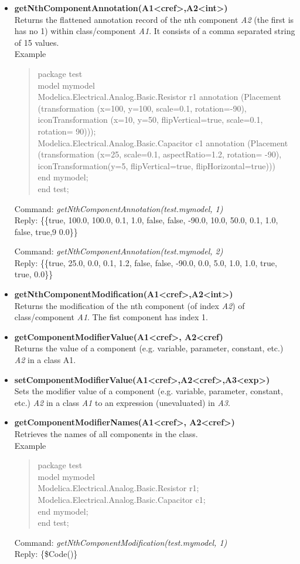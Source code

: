 \documentclass[11pt,a4paper,oneside,english]{book}
\newenvironment{modelicaExamples}{\begin{itemize}}{\end{itemize}}
\newcommand{\api}[2]{\item \textbf{#1} \\ #2}
\newcommand{\tab}{\hspace{2em}}
\newcommand{\command}[1]{Command: \textit{#1}\\}
\newcommand{\reply}[1]{Reply: #1}
\newcommand{\functionex}[2]{\begin{singlespace} \command{#1} \reply{#2} \end{singlespace}}
\newcommand{\examples}{Example}
\newenvironment{mocode}{\begin{verse}\begin{singlespace}\begin{scriptsize}\ttfamily}{\end{scriptsize}\end{singlespace}\end{verse}}
\begin{document}
\begin{modelicaExamples}
		\api{getNthComponentAnnotation(A1<cref>,A2<int>)}{Returns the flattened annotation record of the nth component \textit{A2} (the first is has no 1) within class/component \textit{A1}. It consists of a comma separated string of 15 values.\\
		\examples
		\begin{mocode}
		package test\\
		\tab model mymodel\\
		\tab\tab Modelica.Electrical.Analog.Basic.Resistor r1 annotation (Pla\-ce\-ment (tran\-sfor\-ma\-tion (x=100, y=100, scale=0.1, rotation=-90), i\-con\-Tran\-sfor\-ma\-tion (x=10, y=50, flipVertical=true, scale=0.1, ro\-ta\-tion= 90)));\\
		\tab\tab Modelica.Electrical.Analog.Basic.Capacitor c1 annotation (Pla\-ce\-ment (transformation (x=25,  scale=0.1, aspectRatio=1.2, ro\-ta\-tion= -90), iconTransformation(y=5, flipVertical=true, flipHorizontal=true)))\\
		\tab end mymodel;\\
		end test;
		\end{mocode}
		\functionex{getNthComponentAnnotation(test.mymodel, 1)}
		{\{\{true, 100.0, 100.0, 0.1, 1.0, false, false, -90.0, 10.0, 50.0, 0.1, 1.0, false, true,9 0.0\}\}}

		\functionex{getNthComponentAnnotation(test.mymodel, 2)}
		{\{\{true, 25.0, 0.0, 0.1, 1.2, false, false, -90.0, 0.0, 5.0, 1.0, 1.0, true, true, 0.0\}\}}

		}

			\api{getNthComponentModification(A1<cref>,A2<int>)}{Returns the modification of the nth component (of index \textit{A2}) of class/component \textit{A1}. The fist component has index 1.}

			\api{getComponentModifierValue(A1<cref>, A2<cref)}{Returns the value of a component (e.g. variable, parameter, constant, etc.) \textit{A2} in a class \textup{A1}.}

			\api{setComponentModifierValue(A1<cref>,A2<cref>,A3<exp>)}{Sets the modifier value of a component (e.g. variable, parameter, constant, etc.) \textit{A2} in a class \textit{A1} to an expression (unevaluated) in \textit{A3}.}

			\api{getComponentModifierNames(A1<cref>, A2<cref>)}{Retrieves the names of all components in the class.}\\
			\examples
			\begin{mocode}
			package test\\
			\tab model mymodel\\
			\tab\tab Modelica.Electrical.Analog.Basic.Resistor r1;\\
			\tab\tab Modelica.Electrical.Analog.Basic.Capacitor c1;\\
			\tab end mymodel;\\
			end test;\\
			\end{mocode}
			\functionex{getNthComponentModification(test.mymodel, 1)}
			{\{\$Code()\}}


\end{modelicaExamples}
\end{document}
